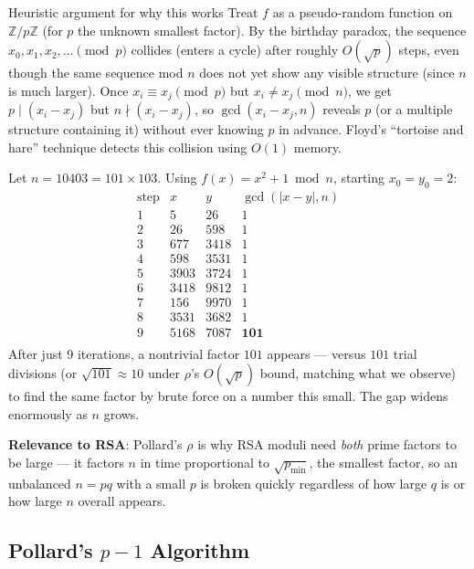 \begin{keybox}{Heuristic argument for why this works}
Treat $f$ as a pseudo-random function on $\mathbb{Z}/p\mathbb{Z}$ (for $p$ the unknown smallest factor). By the birthday paradox, the sequence $x_0, x_1, x_2, \dots \pmod p$ collides (enters a cycle) after roughly $O(\sqrt{p})$ steps, even though the same sequence mod $n$ does not yet show any visible structure (since $n$ is much larger). Once $x_i \equiv x_j \pmod p$ but $x_i \ne x_j \pmod n$, we get $p \mid (x_i - x_j)$ but $n \nmid (x_i - x_j)$, so $\gcd(x_i - x_j, n)$ reveals $p$ (or a multiple structure containing it) without ever knowing $p$ in advance. Floyd's ``tortoise and hare'' technique detects this collision using $O(1)$ memory.
\end{keybox}

\begin{example}
Let $n = 10403 = 101 \times 103$. Using $f(x) = x^2+1 \bmod n$, starting $x_0=y_0=2$:
\[
\begin{array}{c|ccc}
\text{step} & x & y & \gcd(|x-y|,n) \\
\hline
1 & 5 & 26 & 1 \\
2 & 26 & 598 & 1 \\
3 & 677 & 3418 & 1 \\
4 & 598 & 3531 & 1 \\
5 & 3903 & 3724 & 1 \\
6 & 3418 & 9812 & 1 \\
7 & 156 & 9970 & 1 \\
8 & 3531 & 3682 & 1 \\
9 & 5168 & 7087 & \mathbf{101} \\
\end{array}
\]
After just 9 iterations, a nontrivial factor $101$ appears — versus $101$ trial divisions (or $\sqrt{101} \approx 10$ under $\rho$'s $O(\sqrt{p})$ bound, matching what we observe) to find the same factor by brute force on a number this small. The gap widens enormously as $n$ grows.
\end{example}

\textbf{Relevance to RSA}: Pollard's $\rho$ is why RSA moduli need \emph{both} prime factors to be large — it factors $n$ in time proportional to $\sqrt{p_{\min}}$, the smallest factor, so an unbalanced $n = pq$ with a small $p$ is broken quickly regardless of how large $q$ is or how large $n$ overall appears.

\subsection{Pollard's $p-1$ Algorithm}\label{sec:pollard-p1}

